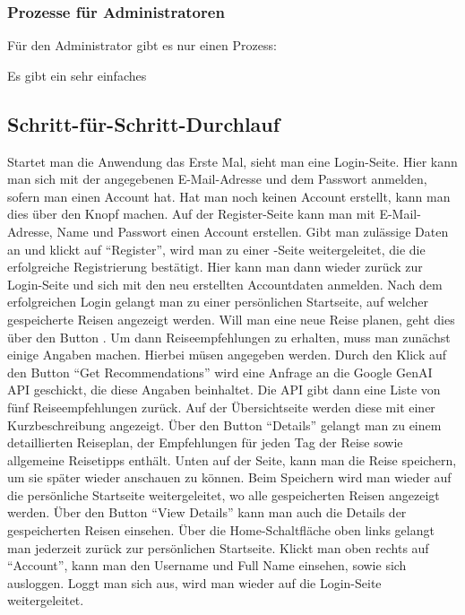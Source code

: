 \subsubsection{Prozesse für Administratoren}

Für den Administrator gibt es nur einen Prozess:

Es gibt ein sehr einfaches 

\subsection{Schritt-für-Schritt-Durchlauf}
Startet man die Anwendung das Erste Mal, sieht man eine Login-Seite. Hier kann man sich mit der angegebenen E-Mail-Adresse und dem Passwort anmelden, sofern man einen Account hat. Hat man noch keinen Account erstellt, kann man dies über den Knopf  machen.
Auf der Register-Seite kann man mit E-Mail-Adresse, Name und Passwort einen Account erstellen. Gibt man zulässige Daten an und klickt auf \enquote{Register}, wird man zu einer -Seite weitergeleitet, die die erfolgreiche Registrierung bestätigt.
Hier kann man dann wieder zurück zur Login-Seite und sich mit den neu erstellten Accountdaten anmelden.
Nach dem erfolgreichen Login gelangt man zu einer persönlichen Startseite, auf welcher gespeicherte Reisen angezeigt werden. Will man eine neue Reise planen, geht dies über den Button .
Um dann Reiseempfehlungen zu erhalten, muss man zunächst einige Angaben machen. Hierbei müsen  angegeben werden.
Durch den Klick auf den Button \enquote{Get Recommendations} wird eine Anfrage an die Google GenAI API geschickt, die diese Angaben beinhaltet. Die API gibt dann eine Liste von fünf Reiseempfehlungen zurück. Auf der Übersichtseite werden diese mit einer Kurzbeschreibung angezeigt. Über den Button \enquote{Details} gelangt man zu einem detaillierten Reiseplan, der Empfehlungen für jeden Tag der Reise sowie allgemeine Reisetipps enthält. Unten auf der Seite, kann man die Reise speichern, um sie später wieder anschauen zu können. Beim Speichern wird man wieder auf die persönliche Startseite weitergeleitet, wo alle gespeicherten Reisen angezeigt werden.
Über den Button \enquote{View Details} kann man auch die Details der gespeicherten Reisen einsehen.
Über die Home-Schaltfläche oben links gelangt man jederzeit zurück zur persönlichen Startseite. Klickt man oben rechts auf \enquote{Account}, kann man den Username und Full Name einsehen, sowie sich ausloggen. Loggt man sich aus, wird man wieder auf die Login-Seite weitergeleitet.
 
